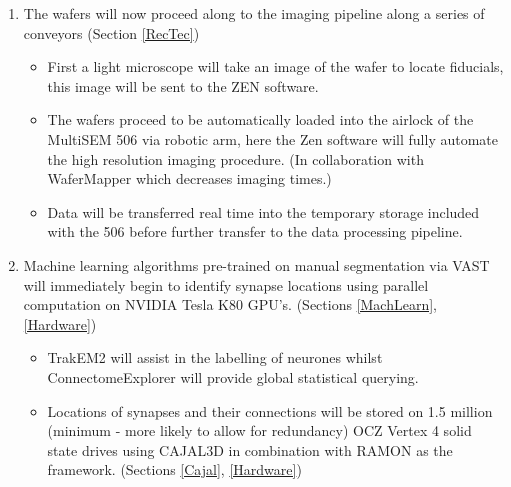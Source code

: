 \documentclass[a4paper, 11pt]{article}
\numberwithin{equation}{section}
\begin{document}
\begin{enumerate}
\begin{itemize}
		\item The sample is passed over a diamond knife relieving \SI{3.5}{\milli\meter} x \SI{2.5}{\milli\meter} x \SI{30}{\nano\meter} sections.
		\item{These are floated onto a plastic tape, which is cut and mounted onto silicon wafers for imaging, along with the placement of fiducial markers. (Section \ref{sectioning_small})}
	\end{itemize}
	
	
	
	
	
	
	\item The wafers will now proceed along to the imaging pipeline along a series of conveyors  (Section \ref{RecTec})
	\begin{itemize}
		\item First a light microscope will take an image of the wafer to locate fiducials, this image will be sent to the ZEN software.
		\item The wafers proceed to be automatically loaded into the airlock of the MultiSEM 506 via robotic arm, here the Zen software will fully automate the high resolution imaging procedure. (In collaboration with WaferMapper which decreases imaging times.)
		\item Data will be transferred real time into the temporary storage included with the 506 before further transfer to the data processing pipeline.
	\end{itemize}
	
	\item Machine learning algorithms pre-trained on manual segmentation via VAST will immediately begin to identify synapse locations using parallel computation on NVIDIA Tesla K80 GPU's. (Sections \ref{MachLearn}, \ref{Hardware})
	\begin{itemize}
		\item TrakEM2 will assist in the labelling of neurones whilst ConnectomeExplorer will provide global statistical querying.
		\item Locations of synapses and their connections will be stored on 1.5 million (minimum - more likely to allow for redundancy) OCZ Vertex 4 solid state drives using CAJAL3D  in combination with RAMON as the framework. (Sections \ref{Cajal}, \ref{Hardware})
	\end{itemize}
	
\end{enumerate}
\end{document}
